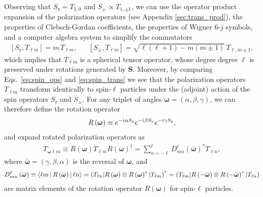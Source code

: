\documentclass[a4paper,twocolumn,unpublished]{quantumarticle}
\newcommand{\p}[1]{\left(#1\right)} %
\renewcommand{\sp}[1]{\left[#1\right]} %
\newcommand{\bk}{\Braket} %
\renewcommand{\i}{\mathrm{i}\mkern1mu} %
\newcommand{\y}{\text{y}}
\newcommand{\z}{\text{z}}
\def\obk#1{\mathinner{({#1})}}
\begin{document}
Observing that $S_\z=T_{1,0}$ and $S_\pm\propto T_{1,\pm1}$, we can use the operator product expansion of the polarization operators (see Appendix \ref{sec:trans_prod}), the properties of Clebsch-Gordan coefficients, the properties of Wigner $6$-$j$ symbols, and a computer algebra system to simplify the commutators
\begin{align}
  \sp{S_\z,T_{\ell m}} = m\, T_{\ell m},
  &&
  \sp{S_\pm,T_{\ell m}} = \sqrt{\ell\p{\ell+1}-m\p{m\pm 1}}\, T_{\ell,m\pm1},
  \label{eq:spin_trans}
\end{align}
which implies that $T_{\ell m}$ is a spherical tensor operator, whose degree degree $\ell$ is preserved under rotations generated by $\bm S$.
Moreover, by comparing Eqs.~\eqref{eq:spin_ops} and \eqref{eq:spin_trans} we see that the polarization operators $T_{\ell m}$ transform identically to spin-$\ell$ particles under the (adjoint) action of the spin operators $S_\z$ and $S_\pm$.
For any triplet of angles $\bm\omega=\p{\alpha,\beta,\gamma}$, we can therefore define the rotation operator
\begin{align}
  R\p{\bm\omega} \equiv
  e^{-\i\alpha S_\z} e^{-\i\beta S_\y} e^{-\i\gamma S_\z},
\end{align}
and expand rotated polarization operators as
\begin{align}
  T_{\bm\omega\ell m} \equiv
  R\p{\bm\omega} T_{\ell m} R\p{\bm\omega}^\dag
  = \sum_{n=-\ell}^\ell D_{mn}^\ell\p{\bar{\bm\omega}}^* T_{\ell n},
  \label{eq:trans_rot_apndx}
\end{align}
where $\bar{\bm\omega}=\p{\gamma,\beta,\alpha}$ is the reversal of $\bm\omega$, and
\begin{align}
  D_{mn}^\ell\p{\bar{\bm\omega}}
  \equiv \bk{\ell m|R\p{\bar{\bm\omega}}|\ell n}
  = \obk{T_{\ell n} | R\p{\bm\omega}
    \otimes R\p{\bm\omega}^* |T_{\ell m}}^*
  = \obk{T_{\ell m} | R\p{-\bar{\bm\omega}}
    \otimes R\p{-\bar{\bm\omega}}^* |T_{\ell n}}
\end{align}
are matrix elements of the rotation operator $R\p{\bm\omega}$ for spin-$\ell$ particles.
\end{document}
